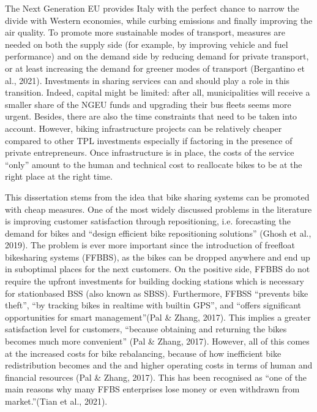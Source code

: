 \documentclass[letterpaper,10pt,english]{jupyterBook}
\begin{document}
\sphinxAtStartPar
The Next Generation EU provides Italy with the perfect chance to narrow the divide with Western economies, while curbing emissions and finally improving the air quality. To promote more sustainable modes of transport, measures are needed on both the supply side (for example, by improving vehicle and fuel performance) and on the demand side by reducing demand for private transport, or at least increasing the demand for greener modes of transport (Bergantino et al., 2021). Investments in sharing services can and should play a role in this transition. Indeed, capital might be limited: after all, municipalities will receive a smaller share of the NGEU funds and upgrading their bus fleets seems more urgent. Besides, there are also the time constraints that need to be taken into account. However, biking infrastructure projects can be relatively cheaper compared to other TPL investments \sphinxhyphen{} especially if factoring in the presence of private entrepreneurs. Once infrastructure is in place, the costs of the service “only” amount to the human and technical cost to reallocate bikes to be at the right place at the right time.

\sphinxAtStartPar
This dissertation stems from the idea that bike sharing systems can be promoted with cheap measures. One of the most widely discussed problems in the literature is improving customer satisfaction through repositioning, i.e. forecasting the demand for bikes and “design efficient bike repositioning solutions” (Ghosh et al., 2019). The problem is ever more important since the introduction of free\sphinxhyphen{}float bike\sphinxhyphen{}sharing systems (FFBBS), as the bikes can be dropped anywhere and end up in sub\sphinxhyphen{}optimal places for the next customers.
On the positive side, FFBBS do not require the upfront investments for building docking stations \sphinxhyphen{} which is necessary for station\sphinxhyphen{}based BSS (also known as SBSS). Furthermore, FFBSS “prevents bike theft”, “by tracking bikes in real\sphinxhyphen{}time with built\sphinxhyphen{}in GPS”, and “offers significant opportunities for smart management”(Pal \& Zhang, 2017). This implies a greater satisfaction level for customers, “because obtaining and returning the bikes becomes much more convenient” (Pal \& Zhang, 2017). However, all of this comes at the increased costs for bike rebalancing, because of how inefficient bike redistribution becomes and the and higher operating costs in terms of human and financial resources (Pal \& Zhang, 2017). This has been recognised as “one of the main reasons why many FFBS enterprises lose money or even withdrawn from market.”(Tian et al., 2021).
\end{document}

